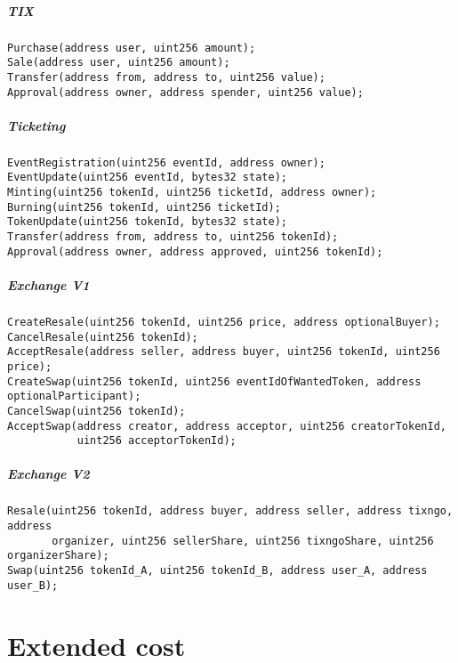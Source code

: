 \documentclass[a4paper,11pt,oneside]{report}
\begin{document}
\paragraph{TIX}
\begin{verbatim}
Purchase(address user, uint256 amount);
Sale(address user, uint256 amount);
Transfer(address from, address to, uint256 value);
Approval(address owner, address spender, uint256 value);
\end{verbatim}

\paragraph{Ticketing}
\begin{verbatim}
EventRegistration(uint256 eventId, address owner);
EventUpdate(uint256 eventId, bytes32 state);
Minting(uint256 tokenId, uint256 ticketId, address owner);
Burning(uint256 tokenId, uint256 ticketId);
TokenUpdate(uint256 tokenId, bytes32 state);
Transfer(address from, address to, uint256 tokenId);
Approval(address owner, address approved, uint256 tokenId);
\end{verbatim}

\paragraph{Exchange V1}
\begin{verbatim}
CreateResale(uint256 tokenId, uint256 price, address optionalBuyer);
CancelResale(uint256 tokenId);
AcceptResale(address seller, address buyer, uint256 tokenId, uint256 price);
CreateSwap(uint256 tokenId, uint256 eventIdOfWantedToken, address optionalParticipant);
CancelSwap(uint256 tokenId);
AcceptSwap(address creator, address acceptor, uint256 creatorTokenId, 
           uint256 acceptorTokenId);
\end{verbatim}

\paragraph{Exchange V2}
\begin{verbatim}
Resale(uint256 tokenId, address buyer, address seller, address tixngo, address 
       organizer, uint256 sellerShare, uint256 tixngoShare, uint256 organizerShare);
Swap(uint256 tokenId_A, uint256 tokenId_B, address user_A, address user_B);
\end{verbatim}

\chapter{Extended cost}
\label{sec:appendix_b}
\end{document}
